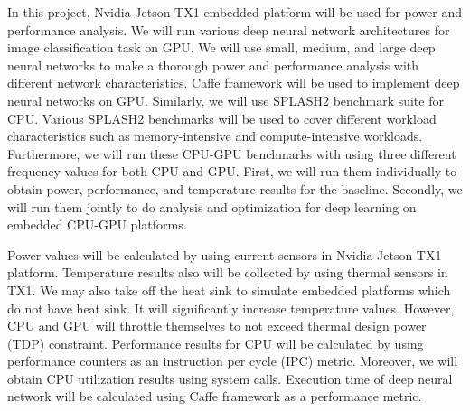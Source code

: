 In this project, Nvidia Jetson TX1 embedded platform will be used for power and performance analysis. We will run various deep neural network architectures for image classification task on GPU. We will use small, medium, and large deep neural networks to make a thorough power and performance analysis with different network characteristics. Caffe framework \cite{caffe} will be used to implement deep neural networks on GPU. Similarly, we will use SPLASH2 benchmark suite \cite{woo1995splash} for CPU. Various SPLASH2 benchmarks will be used to cover different workload characteristics such as memory-intensive and compute-intensive workloads. Furthermore, we will run these CPU-GPU benchmarks with using three different frequency values for both CPU and GPU. First, we will run them individually to obtain power, performance, and temperature results for the baseline. Secondly, we will run them jointly to do analysis and optimization for deep learning on embedded CPU-GPU platforms.

Power values will be calculated by using current sensors in Nvidia Jetson TX1 platform. Temperature results also will be collected by using thermal sensors in TX1. We may also take off the heat sink to simulate embedded platforms which do not have heat sink. It will significantly increase temperature values. However, CPU and GPU will throttle themselves to not exceed thermal design power (TDP) constraint. Performance results for CPU will be calculated by using performance counters as an instruction per cycle (IPC) metric. Moreover, we will obtain CPU utilization results using system calls. Execution time of deep neural network will be calculated using Caffe framework as a performance metric. 

